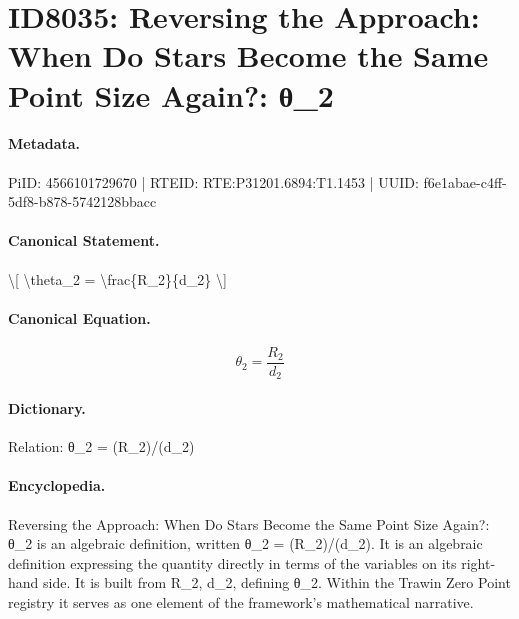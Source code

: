\section*{ID8035: Reversing the Approach: When Do Stars Become the Same Point Size Again?: θ\_2}
\paragraph{Metadata.}
PiID: 4566101729670 | RTEID: RTE:P31201.6894:T1.1453 | UUID: f6e1abae-c4ff-5df8-b878-5742128bbacc

\paragraph{Canonical Statement.}
\textbackslash{}[ \textbackslash{}theta\_2 = \textbackslash{}frac\{R\_2\}\{d\_2\} \textbackslash{}]

\paragraph{Canonical Equation.}
\[
\theta_2 = \frac{R_2}{d_2}
\]

\paragraph{Dictionary.}
Relation: θ\_2 = (R\_2)/(d\_2)

\paragraph{Encyclopedia.}
Reversing the Approach: When Do Stars Become the Same Point Size Again?: θ\_2 is an algebraic definition, written θ\_2 = (R\_2)/(d\_2). It is an algebraic definition expressing the quantity directly in terms of the variables on its right-hand side. It is built from R\_2, d\_2, defining θ\_2. Within the Trawin Zero Point registry it serves as one element of the framework's mathematical narrative.
